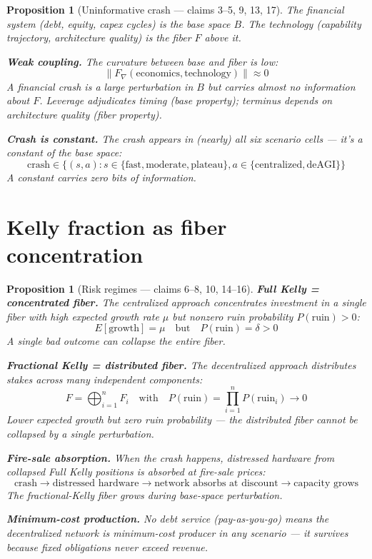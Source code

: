 \documentclass[11pt,a4paper]{article}
\newtheorem{proposition}[definition]{Proposition}
\begin{document}
\begin{proposition}[Uninformative crash --- claims 3--5, 9, 13, 17]
\label{prop:crash}
The financial system (debt, equity, capex cycles) is the base space $B$.
The technology (capability trajectory, architecture quality) is the fiber
$F$ above it.

\textbf{Weak coupling.} The curvature between base and fiber is low:
\[
  \|F_\nabla(\text{economics}, \text{technology})\| \approx 0
\]
A financial crash is a large perturbation in $B$ but carries almost no
information about $F$. Leverage adjudicates timing (base property);
terminus depends on architecture quality (fiber property).

\textbf{Crash is constant.} The crash appears in (nearly) all six
scenario cells --- it's a constant of the base space:
\[
  \text{crash} \in \{(s, a) : s \in \{\text{fast}, \text{moderate},
    \text{plateau}\}, a \in \{\text{centralized}, \text{deAGI}\}\}
\]
A constant carries zero bits of information.
\end{proposition}

\section{Kelly fraction as fiber concentration}

\begin{proposition}[Risk regimes --- claims 6--8, 10, 14--16]
\label{prop:kelly}
\textbf{Full Kelly = concentrated fiber.} The centralized approach
concentrates investment in a single fiber with high expected growth rate
$\mu$ but nonzero ruin probability $P(\text{ruin}) > 0$:
\[
  E[\text{growth}] = \mu \quad \text{but} \quad
    P(\text{ruin}) = \delta > 0
\]
A single bad outcome can collapse the entire fiber.

\textbf{Fractional Kelly = distributed fiber.} The decentralized approach
distributes stakes across many independent components:
\[
  F = \bigoplus_{i=1}^n F_i \quad \text{with} \quad
    P(\text{ruin}) = \prod_{i=1}^n P(\text{ruin}_i) \to 0
\]
Lower expected growth but zero ruin probability --- the distributed
fiber cannot be collapsed by a single perturbation.

\textbf{Fire-sale absorption.} When the crash happens, distressed hardware
from collapsed Full Kelly positions is absorbed at fire-sale prices:
\[
  \text{crash} \to \text{distressed hardware} \to
    \text{network absorbs at discount} \to \text{capacity grows}
\]
The fractional-Kelly fiber grows during base-space perturbation.

\textbf{Minimum-cost production.} No debt service (pay-as-you-go) means
the decentralized network is minimum-cost producer in any scenario ---
it survives because fixed obligations never exceed revenue.
\end{proposition}
\end{document}
